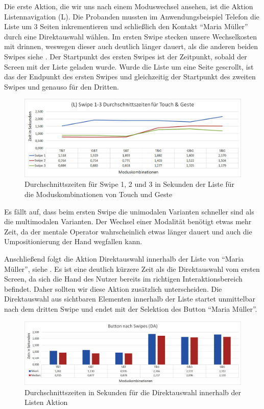 Die erste Aktion, die wir uns nach einem Moduswechsel ansehen, ist die Aktion Listennavigation (L). Die Probanden mussten im Anwendungsbeispiel Telefon die Liste um 3 Seiten inkrementieren und schließlich den Kontakt "`Maria Müller"' durch eine Direktauswahl wählen. Im ersten Swipe stecken unsere Wechselkosten mit drinnen, weswegen dieser auch deutlich länger dauert, als die anderen beiden Swipes siehe . Der Startpunkt des ersten Swipes ist der Zeitpunkt, sobald der Screen mit der Liste geladen wurde. Wurde die Liste um eine Seite gescrollt, ist das der Endpunkt des ersten Swipes und gleichzeitig der Startpunkt des zweiten Swipes und genauso für den Dritten. 
\begin{figure}[ht]
  \centering
  \includegraphics[width=1\textwidth]{img/Swipe1-3_Phone.JPG}
  \caption{Durchschnittszeiten für Swipe 1, 2 und 3 in Sekunden der Liste für die Moduskombinationen von Touch und Geste}
  \label{fig:Swipe13Phone}
\end{figure}
Es fällt auf, dass beim ersten Swipe die unimodalen Varianten schneller sind als die multimodalen Varianten. Der Wechsel einer Modalität benötigt etwas mehr Zeit, da der mentale Operator wahrscheinlich etwas länger dauert und auch die Umpositionierung der Hand wegfallen kann. 

Anschließend folgt die Aktion Direktauswahl innerhalb der Liste von "`Maria Müller"', siehe . Es ist eine deutlich kürzere Zeit als die Direktauswahl vom ersten Screen, da sich die Hand des Nutzer bereits im richtigen Interaktionsbereich befindet. Daher sollten wir diese Aktion zusätzlich unterscheiden. Die Direktauswahl aus sichtbaren Elementen innerhalb der Liste startet unmittelbar nach dem dritten Swipe und endet mit der Selektion des Button "`Maria Müller"'.
\begin{figure}[ht]
  \centering
  \includegraphics[width=1\textwidth]{img/DA_Swipe.JPG}
  \caption{Durchschnittszeiten in Sekunden für die Direktauswahl innerhalb der Listen Aktion}
  \label{fig:DA_Swipe}
\end{figure}

